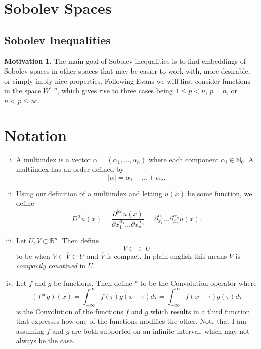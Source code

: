 \documentclass[11pt]{article}
\theoremstyle{definition}
\newtheorem*{motivation}{Motivation}
\begin{document}
\newpage

\section{Sobolev Spaces}
\subsection{Sobolev Inequalities}
\begin{motivation}
The main goal of Sobolev inequalities is to find embeddings of Sobolev spaces in other spaces that may be easier to work with, more desirable,
or simply imply nice properties. Following Evans we will first consider functions in the space $W^{1,p}$, which gives rise to three cases being
$1 \leq p < n$, $p=n$, or $n < p \leq \infty$.
\end{motivation}


\newpage

\section{Notation}
\begin{enumerate}[(i)]
\item A multiindex is a vector $\alpha = (\alpha_1, \dots, \alpha_n)$ where each component $\alpha_i \in \mathbb{N}_0$.
A multiindex has an order defined by
\[|\alpha| = \alpha_1 + \dots + \alpha_n.\]

\item Using our definition of a multiindex and letting $u(x)$ be some function, we define
\[D^{\alpha}u(x) = \frac{\partial^{|\alpha|}u(x)}{\partial x_1^{\alpha_1} \dots \partial x_n^{\alpha_n}} = \partial_{x_1}^{\alpha_1}\dots\partial_{x_n}^{\alpha_n}u(x).\]

\item Let $U,V \subset \mathbb{R}^n$. Then define
\[V \subset\subset U\]
to be when $V \subset \overline{V} \subset U$ and $\overline{V}$ is compact. In plain english this means $V$ is \textit{compactly conatined} in $U$.

\item Let $f$ and $g$ be functions. Then define $*$ to be the Convolution operator where
\[(f*g)(x) = \int_{-\infty}^{\infty}{f(\tau)g(x - \tau)d\tau} = \int_{-\infty}^{\infty}{f(x - \tau)g(\tau)d\tau}\]
is the Convolution of the functions $f$ and $g$ which results in a third function that expresses
how one of the functions modifies the other. Note that I am assuming $f$ and $g$ are both supported on an
infinite interval, which may not always be the case.
\end{enumerate}
\end{document}
